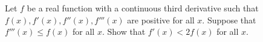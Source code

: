 Let $f$ be a real function with a continuous third derivative such that $f(x),
f'(x), f''(x), f'''(x)$ are positive for all $x$.  Suppose that
$f'''(x)\leq f(x)$ for all $x$.  Show that $f'(x)<2f(x)$ for all $x$.
